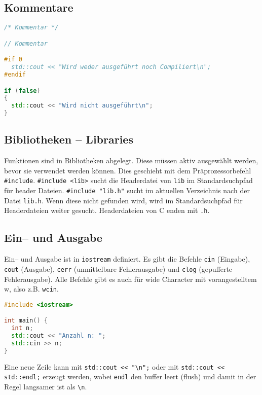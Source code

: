 \documentclass[10pt,twocolumn]{scrartcl}
\begin{document}
\subsection{Kommentare}

\begin{lstlisting}[language=C++]
/* Kommentar */

// Kommentar

#if 0
  std::cout << "Wird weder ausgeführt noch Compiliert\n";
#endif

if (false)
{
  std::cout << "Wird nicht ausgeführt\n";
}
\end{lstlisting}

\subsection{Bibliotheken -- Libraries}

Funktionen sind in Bibliotheken abgelegt. Diese müssen aktiv ausgewählt werden,
bevor sie verwendet werden können. Dies geschieht mit dem Präprozessorbefehl
\lstinline|#include|. \lstinline|#include <lib>| sucht die Headerdatei von
\lstinline|lib| im Standardsuchpfad für header Dateien.
\lstinline|#include "lib.h"| sucht im aktuellen Verzeichnis nach der Datei
\lstinline|lib.h|. Wenn diese nicht gefunden wird, wird im Standardsuchpfad für
Headerdateien weiter gesucht. Headerdateien von C enden mit \lstinline|.h|.

\subsection{Ein-- und Ausgabe}

Ein-- und Ausgabe ist in \lstinline|iostream| definiert. Es gibt die Befehle
\lstinline|cin| (Eingabe), \lstinline|cout| (Ausgabe), \lstinline|cerr|
(unmittelbare Fehlerausgabe) und \lstinline|clog| (gepufferte Fehlerausgabe).
Alle Befehle gibt es auch für wide Character mit vorangestelltem w, also z.B.
\lstinline|wcin|.

\begin{lstlisting}[language=C++]
#include <iostream>

int main() {
  int n;
  std::cout << "Anzahl n: ";
  std::cin >> n;
}
\end{lstlisting}

Eine neue Zeile kann mit \lstinline|std::cout << "\n";| oder mit
\lstinline|std::cout << std::endl;| erzeugt werden, wobei \lstinline|endl| den
buffer leert (flush) und damit in der Regel langsamer ist als \lstinline|\n|.
\end{document}
